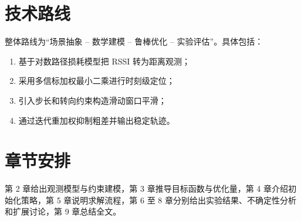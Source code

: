 \section{技术路线}
整体路线为“场景抽象 -- 数学建模 -- 鲁棒优化 -- 实验评估”。具体包括：
\begin{enumerate}
  \item 基于对数路径损耗模型把 RSSI 转为距离观测；
  \item 采用多信标加权最小二乘进行时刻级定位；
  \item 引入步长和转向约束构造滑动窗口平滑；
  \item 通过迭代重加权抑制粗差并输出稳定轨迹。
\end{enumerate}

\section{章节安排}
第 2 章给出观测模型与约束建模，第 3 章推导目标函数与优化量，第 4 章介绍初始化策略，第 5 章说明求解流程，第 6 至 8 章分别给出实验结果、不确定性分析和扩展讨论，第 9 章总结全文。
